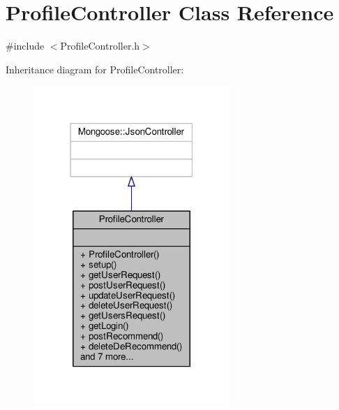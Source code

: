 \hypertarget{classProfileController}{}\section{Profile\+Controller Class Reference}
\label{classProfileController}


{\ttfamily \#include $<$Profile\+Controller.\+h$>$}



Inheritance diagram for Profile\+Controller\+:\nopagebreak
\begin{figure}[H]
\begin{center}
\leavevmode
\includegraphics[width=211pt]{da/de3/classProfileController__inherit__graph}
\end{center}
\end{figure}


